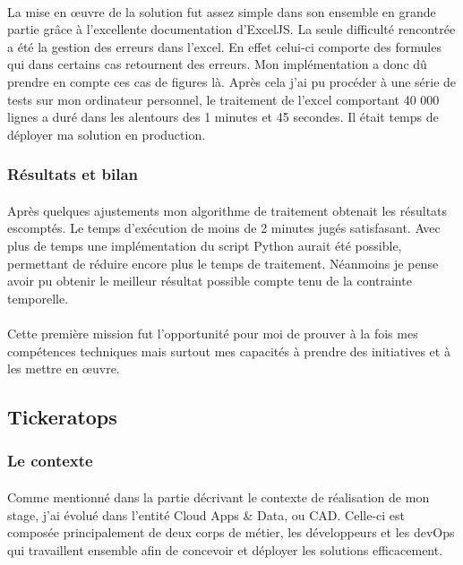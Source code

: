 \documentclass[12pt]{article}
\begin{document}
\begin {sloppypar}
\paragraph{}
La mise en œuvre de la solution fut assez simple dans son ensemble en grande partie 
grâce à l'excellente documentation d'ExcelJS. La seule difficulté rencontrée a été la gestion 
des erreurs dans l'excel. En effet celui-ci comporte des formules qui dans certains cas retournent
des erreurs. Mon implémentation a donc dû prendre en compte ces cas de figures là. Après cela j'ai pu 
procéder à une série de tests sur mon ordinateur personnel, le traitement de l'excel comportant 40 000
lignes a duré dans les alentours des 1 minutes et 45 secondes. Il était temps de déployer ma solution 
en production.
\subsubsection{Résultats et bilan}
\paragraph{}
Après quelques ajustements mon algorithme de traitement obtenait les résultats escomptés.
Le temps d'exécution de moins de 2 minutes jugés satisfasant. 
\linebreak 
Avec plus de temps une implémentation du script Python aurait été possible, permettant de réduire encore
plus le temps de traitement. Néanmoins je pense avoir pu obtenir le meilleur résultat possible 
compte tenu de la contrainte temporelle.
\paragraph{}
Cette première mission fut l'opportunité pour moi de prouver à la fois mes compétences techniques
mais surtout mes capacités à prendre des initiatives et à les mettre en œuvre.

\newpage
\subsection{Tickeratops}
\subsubsection{Le contexte}
\paragraph{}
Comme mentionné dans la partie décrivant le contexte de réalisation de mon stage, j'ai évolué 
dans l'entité Cloud Apps \& Data, ou CAD. Celle-ci est composée principalement de deux corps 
de métier, les développeurs et les devOps qui travaillent ensemble afin de concevoir 
et déployer les solutions efficacement.

\end{sloppypar}
\end{document}
